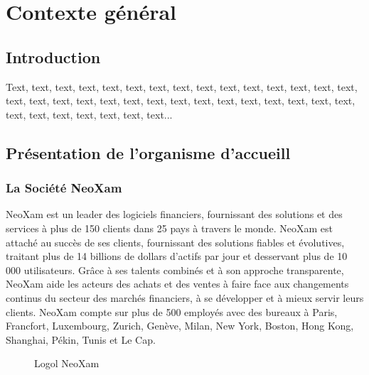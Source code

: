 \chapter{Contexte général}
\section*{Introduction}
Text, text, text, text, text, text, text, text, text, text, text, text, text, text, text, text, text, text, text, text, text, text, text, text, text, text, text, text, text, text, text, text, text, text, text, text, text...


\section[Organisme d'accueil]{Présentation de l’organisme d’accueill \cite{webArticle1}}
\subsection{La Société NeoXam}

NeoXam est un leader des logiciels financiers, fournissant des solutions et des services à plus de 150 clients dans 25 pays à travers le monde. NeoXam est attaché au succès de ses clients, fournissant des solutions fiables et évolutives, traitant plus de 14 billions de dollars d'actifs par jour et desservant plus de 10 000 utilisateurs. Grâce à ses talents combinés et à son approche transparente, NeoXam aide les acteurs des achats et des ventes à faire face aux changements continus du secteur des marchés financiers, à se développer et à mieux servir leurs clients. NeoXam compte sur plus de 500 employés avec des bureaux à Paris, Francfort, Luxembourg, Zurich, Genève, Milan, New York, Boston, Hong Kong, Shanghai, Pékin, Tunis et Le Cap.


\begin{figure}[htpb]
\centering
{}
\caption{Logol NeoXam}
\label{fig:logo_tt}
\end{figure}



